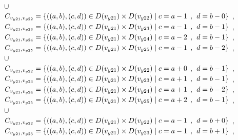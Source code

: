 \\$\cup$
\\$C_{v_{y21},v_{y22}}=\{((a,b),(c,d))\in D(v_{y21}) \times D(v_{y22})\mid c = a - 1\hspace{1ex} , \hspace{1ex}  d = b - 0 \}$ , 
\\$C_{v_{y21},v_{y23}}=\{((a,b),(c,d))\in D(v_{y21}) \times D(v_{y23})\mid c = a - 1\hspace{1ex} , \hspace{1ex}  d = b - 1 \}$ , 
\\$C_{v_{y21},v_{y24}}=\{((a,b),(c,d))\in D(v_{y21}) \times D(v_{y24})\mid c = a - 2\hspace{1ex} , \hspace{1ex}  d = b - 1 \}$ , 
\\$C_{v_{y21},v_{y25}}=\{((a,b),(c,d))\in D(v_{y21}) \times D(v_{y25})\mid c = a - 1\hspace{1ex} , \hspace{1ex}  d = b - 2 \}$ , 
\\$\cup$
\\$C_{v_{y21},v_{y22}}=\{((a,b),(c,d))\in D(v_{y21}) \times D(v_{y22})\mid c = a + 0\hspace{1ex} , \hspace{1ex}  d = b - 1 \}$ , 
\\$C_{v_{y21},v_{y23}}=\{((a,b),(c,d))\in D(v_{y21}) \times D(v_{y23})\mid c = a + 1\hspace{1ex} , \hspace{1ex}  d = b - 1 \}$ , 
\\$C_{v_{y21},v_{y24}}=\{((a,b),(c,d))\in D(v_{y21}) \times D(v_{y24})\mid c = a + 1\hspace{1ex} , \hspace{1ex}  d = b - 2 \}$ , 
\\$C_{v_{y21},v_{y25}}=\{((a,b),(c,d))\in D(v_{y21}) \times D(v_{y25})\mid c = a + 2\hspace{1ex} , \hspace{1ex}  d = b - 1 \}$ , 
\\$\cup$
\\$C_{v_{y21},v_{y22}}=\{((a,b),(c,d))\in D(v_{y21}) \times D(v_{y22})\mid c = a - 1\hspace{1ex} , \hspace{1ex}  d = b + 0 \}$ , 
\\$C_{v_{y21},v_{y23}}=\{((a,b),(c,d))\in D(v_{y21}) \times D(v_{y23})\mid c = a - 1\hspace{1ex} , \hspace{1ex}  d = b + 1 \}$ , 

